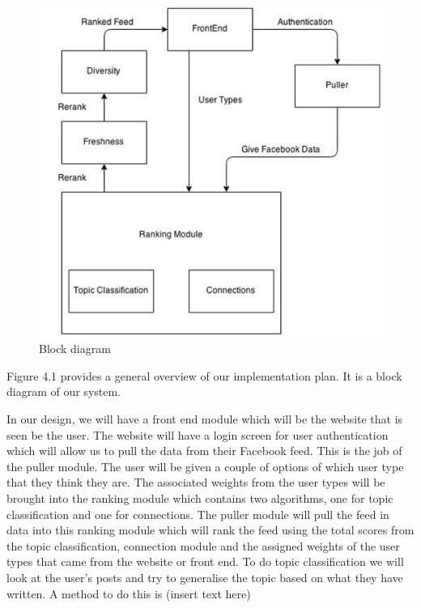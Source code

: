\begin{figure}[bp!]
\centering
\graphicspath{{images/} }
\includegraphics[scale=0.5]{blockdiagram.jpg}
\caption{Block diagram}
\end{figure}

Figure 4.1 provides a general overview of our implementation plan. It is a block diagram of our system. 

In our design, we will have a front end module which will be the website that is seen be the user. The website will have a login screen for user authentication which will allow us to pull the data from their Facebook feed. This is the job of the puller module.  The user will be given a couple of options of which user type that they think they are. The associated weights from the user types will be brought into the ranking module which contains two algorithms, one for topic classification and one for connections. The puller module will pull the feed in data into this ranking module which will rank the feed using the total scores from the topic classification, connection module and the assigned weights of the user types that came from the website or front end. To do topic classification we will look at the user's posts and try to generalise the topic based on what they have written. A method to do this is (insert text here)

